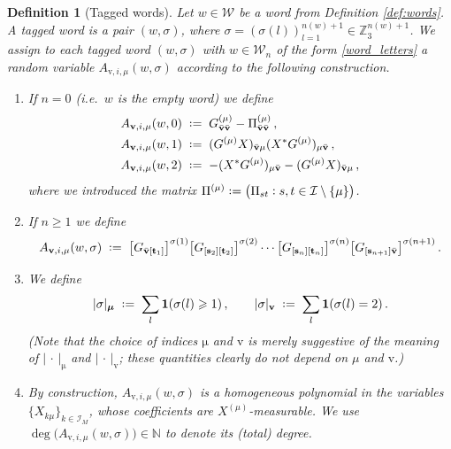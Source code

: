 \documentclass[11pt]{article} %
\numberwithin{equation}{section}
\numberwithin{figure}{section}
\theoremstyle{plain} %
\newtheorem{definition}[theorem]{Definition}
\theoremstyle{definition} %
\newcommand{\f}[1]{\boldsymbol{\mathrm{#1}}} %
\renewcommand{\cal}{\mathcal}
\newcommand{\N}{\mathbb{N}}
\newcommand{\Z}{\mathbb{Z}}
\newcommand{\col}{\mathrel{\vcenter{\baselineskip0.75ex \lineskiplimit0pt \hbox{.}\hbox{.}}}}
\newcommand*{\deq}{\mathrel{\vcenter{\baselineskip0.65ex \lineskiplimit0pt \hbox{.}\hbox{.}}}=}
\renewcommand{\geq}{\geqslant}
\newcommand{\ind}[1]{\f 1 (#1)}
\newcommand{\pb}[1]{\bigl({#1}\bigr)}
\newcommand{\qb}[1]{\bigl[{#1}\bigr]}
\newcommand{\abs}[1]{\lvert #1 \rvert}
\begin{document}
\begin{definition}[Tagged words] \label{def:4-words}
Let $w \in \cal W$ be a word from Definition \ref{def:words}. A \emph{tagged word} is a pair $(w, \sigma)$, where $\sigma = (\sigma(l))_{l = 1}^{n(w) + 1} \in \Z_3^{n(w) + 1}$. We assign to each tagged word $(w,\sigma)$ with $w \in \cal W_n$ of the form \eqref{word_letters} a random variable $A_{\f v,i,\mu}(w,\sigma)$ according to the following construction.
\begin{enumerate}
\item
If $n = 0$ (i.e.\ $w$ is the empty word) we define
\begin{align*}
A_{\f v,i,\mu}(w,0) &\;\deq\; G_{\bar {\f v} \bar {\f v}}^{(\mu)} - \Pi_{\bar {\f v} \bar {\f v}}^{(\mu)}\,,
\\
A_{\f v,i,\mu}(w,1) &\;\deq\; (G^{(\mu)} X)_{\bar {\f v} \mu} (X^* G^{(\mu)})_{\mu \bar {\f v}}\,,
\\
A_{\f v,i,\mu}(w,2) &\;\deq\; - (X^* G^{(\mu)})_{\mu \bar {\f v}} - (G^{(\mu)} X)_{\bar {\f v} \mu}\,,
\end{align*}
where we introduced the matrix $\Pi^{(\mu)} \deq \pb{\Pi_{st} \col s,t \in \cal I \setminus \{\mu\}}$.


\item
If $n \geq 1$ we define
\begin{equation} \label{Angeq1def}
A_{\f v,i,\mu}(w,\sigma) \;\deq\; \qb{{  G}_{\bar{\f v} [\f t_1]}}^{\sigma(1)} \qb{G_{[\f s_2] [\f t_2]}}^{\sigma(2)} \cdots \qb{G_{[\f s_n] [\f t_n]}}^{\sigma(n)} \qb{{ G}_{[\f s_{n+1}] \bar{\f v}}}^{\sigma(n+1)}\,.
\end{equation}
\item
We define
\begin{equation*}
\abs{\sigma}_{\f \mu} \;\deq\; \sum_l \ind{\sigma(l) \geq 1}\,, \qquad 
\abs{\sigma}_{\f v} \;\deq\; \sum_{l} \ind{\sigma(l) = 2}\,.
\end{equation*}
(Note that the choice of indices $\f \mu$ and $\f v$ is merely suggestive of the meaning of $\abs{\, \cdot \,}_{\f \mu}$ and $\abs{\, \cdot\,}_{\f v}$; these quantities clearly do not depend on $\mu$ and $\f v$.)
\item
By construction, $A_{\f v,i,\mu}(w,\sigma)$ is a homogeneous polynomial in the variables $\{X_{k \mu}\}_{k \in \cal I_M}$, whose coefficients are $X^{(\mu)}$-measurable. We use $\deg \pb{A_{\f v,i,\mu}(w,\sigma)} \in \N$ to denote its (total) degree.
\end{enumerate}
\end{definition}
\end{document}
